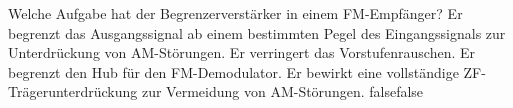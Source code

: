     {Welche Aufgabe hat der Begrenzerverstärker in einem FM-Empfänger?}
    {Er begrenzt das Ausgangssignal ab einem bestimmten Pegel des Eingangssignals zur Unterdrückung von AM-Störungen.   }
    {Er verringert das Vorstufenrauschen.}
    {Er begrenzt den Hub für den FM-Demodulator.}
    {Er bewirkt eine vollständige ZF-Trägerunterdrückung zur Vermeidung von AM-Störungen.}
    {false}{false}